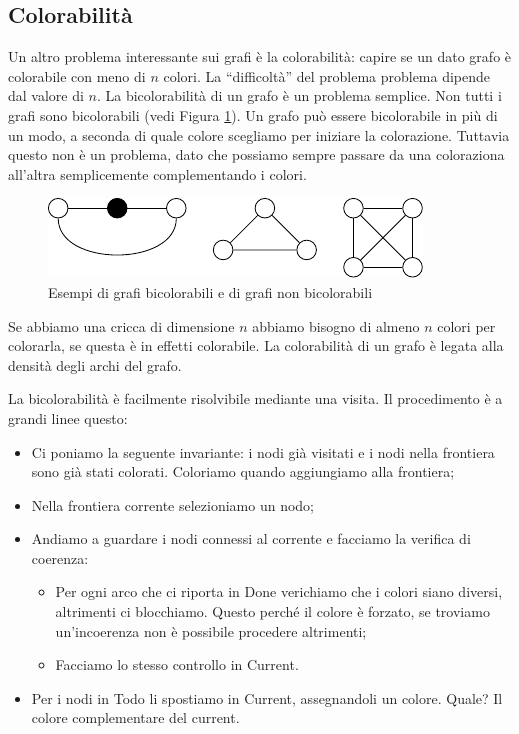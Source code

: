 \subsection{Colorabilità}

Un altro problema interessante sui grafi è la colorabilità: capire se un dato grafo è colorabile con
meno di $n$ colori. La ``difficoltà'' del problema problema dipende dal valore di $n$. La
bicolorabilità di un grafo è un problema semplice. Non tutti i grafi sono bicolorabili (vedi Figura
\ref{TwoColorableGraphs}). Un grafo può essere bicolorabile in più di un modo, a seconda di quale
colore scegliamo per iniziare la colorazione. Tuttavia questo non è un problema, dato che possiamo
sempre passare da una coloraziona all'altra semplicemente complementando i colori.

\begin{figure}[h]
    \begin{center}
        \includegraphics{./img/complexity_intro/2ColorableGraphs.pdf}
    \end{center}
    \caption{Esempi di grafi bicolorabili e di grafi non bicolorabili}
    \label{TwoColorableGraphs}
\end{figure}

Se abbiamo una cricca di dimensione $n$ abbiamo bisogno di almeno $n$ colori per colorarla, se
questa è in effetti colorabile. La colorabilità di un grafo è legata alla densità degli archi del
grafo.

La bicolorabilità è facilmente risolvibile mediante una visita. Il procedimento è a grandi linee
questo:
\begin{itemize}
    \item Ci poniamo la seguente invariante: i nodi già visitati e i nodi nella frontiera sono già
    stati colorati. Coloriamo quando aggiungiamo alla frontiera;
    \item Nella frontiera corrente selezioniamo un nodo;
    \item Andiamo a guardare i nodi connessi al corrente e facciamo la verifica di coerenza:
    \begin{itemize}
        \item Per ogni arco che ci riporta in Done verichiamo che i colori siano diversi, altrimenti
        ci blocchiamo. Questo perché il colore è forzato, se troviamo un'incoerenza non è
        possibile procedere altrimenti;
        \item Facciamo lo stesso controllo in Current.
    \end{itemize}
    \item Per i nodi in Todo li spostiamo in Current, assegnandoli un colore. Quale? Il colore
    complementare del current.
\end{itemize}

